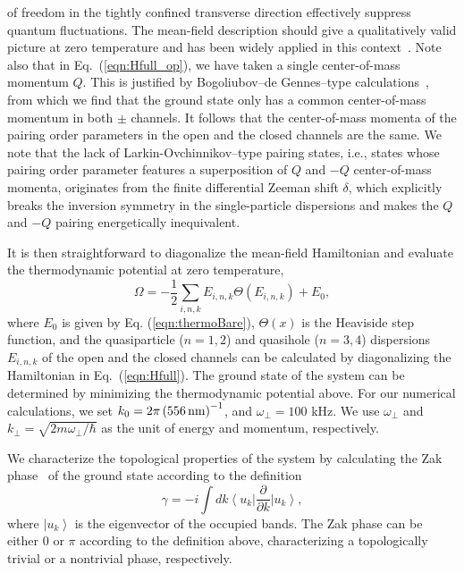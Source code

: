 \documentclass[a4paper, aps,pra, twocolumn, superscriptaddress, showpacs]{revtex4}
\begin{document}
of freedom in the tightly confined transverse direction effectively suppress quantum fluctuations. The mean-field description should give a qualitatively valid picture at zero temperature and has been widely applied in this context~\cite{bakhtiari_spectral_2008,chen_inhomogeneous_2013}. Note also that in Eq.~(\ref{eqn:Hfull_op}), we have taken a single center-of-mass momentum $Q$. This is justified by Bogoliubov--de Gennes--type calculations~\cite{de_gennes_superconductivity_1999}, from which we find that the ground state only has a common center-of-mass momentum in both $\pm$ channels. It follows that the center-of-mass momenta of the pairing order parameters in the open and the closed channels are the same. We note that the lack of Larkin-Ovchinnikov--type pairing states, i.e., states whose pairing order parameter features a superposition of $Q$ and $-Q$ center-of-mass momenta, originates from the finite differential Zeeman shift $\delta$, which explicitly breaks the inversion symmetry in the single-particle dispersions and makes the $Q$ and $-Q$ pairing energetically inequivalent.

%

It is then straightforward to diagonalize the mean-field Hamiltonian and evaluate the thermodynamic potential at zero temperature,
\begin{equation}
  \Omega  =  -\frac{1}{2}\sum_{i,n,k}E_{i,n,k} \Theta\left(E_{i,n,k}\right)+E_0,\label{eqn:thermo}
\end{equation}
where $E_0$ is given by Eq. (\ref{eqn:thermoBare}), $\Theta(x)$ is the Heaviside step function, and the quasiparticle ($n=1,2$) and quasihole ($n=3,4$) dispersions $E_{i,n,k}$ of the open and the closed channels can be calculated by diagonalizing the Hamiltonian in Eq.~(\ref{eqn:Hfull}). The ground state of the system can be determined by minimizing the thermodynamic potential above. For our numerical calculations, we set
$k_0=2\pi\left(556{\,\rm{nm}}\right)^{-1}$, and $\omega_{\perp}=100$ kHz. We use $\omega_{\perp}$ and $k_{\perp}=\sqrt{2m\omega_{\perp}/\hbar}$ as the unit of energy and momentum, respectively.

We characterize the topological properties of the system by calculating the Zak phase~\cite{zak_berrys_1989,atala_direct_2013} of the ground state according to the definition
\begin{equation}
\gamma=-i\int dk\left\langle u_{k}\right|\frac{\partial}{\partial k}\left|u_{k}\right\rangle ,
\end{equation}
where $\left|u_{k}\right\rangle $ is the eigenvector of the occupied bands.
The Zak phase can be either $0$ or $\pi$ according to the definition above,
characterizing a topologically trivial or a nontrivial phase, respectively.
\end{document}
